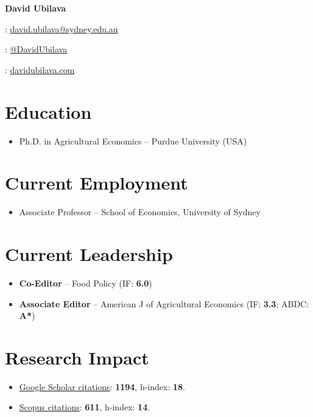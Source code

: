 \documentclass[10pt]{article}
\begin{document}
	
	
	
	\hspace{0.00in}\Large{\bfseries{David Ubilava \faGraduationCap}}
	\normalsize
	
	\medskip
	
	{\faEnvelope: \href{mailto:david.ubilava@sydney.edu.au}{david.ubilava@sydney.edu.au}}
	
	\smallskip
	
	{\faTwitter: \href{https://twitter.com/DavidUbilava}{@DavidUbilava}}
	
	\smallskip
	
	{\faGlobe: \href{https://davidubilava.com}{davidubilava.com}}
	
	
	\medskip
	
	
	\section*{Education}
	\begin{itemize}
	\item {} Ph.D. in Agricultural Economics -- Purdue University (USA)
	\end{itemize}
	
	\section*{Current Employment}
	\begin{itemize}
		\item {} Associate Professor -- School of Economics, University of Sydney
	\end{itemize}
	
	\section*{Current Leadership}
	\begin{itemize}
		\item {} \textbf{Co-Editor} -- Food Policy (IF: \textbf{6.0})
		\item {} \textbf{Associate Editor} -- American J of Agricultural Economics (IF: \textbf{3.3}; ABDC: \textbf{A*})
	\end{itemize}
	
	\section*{Research Impact}
	\begin{itemize}
	\item \href{https://scholar.google.com/citations?user=VbNOr6wAAAAJ&hl=en}{Google Scholar citations}: \textbf{1194}, h-index: \textbf{18}.
	\item \href{https://www.scopus.com/authid/detail.uri?authorId=26421832000}{Scopus citations}: \textbf{611}, h-index: \textbf{14}.	
	\end{itemize}
	
\end{document}
